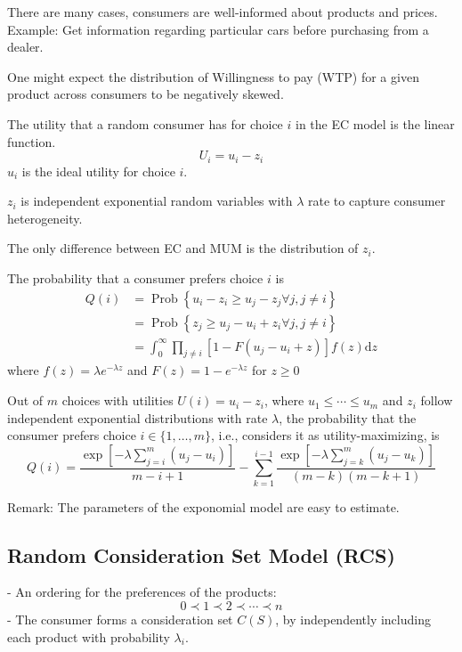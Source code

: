 \documentclass[11pt]{elegantbook}
\begin{document}
There are many cases, consumers are well-informed about products and prices.
Example: Get information regarding particular cars before purchasing from a dealer.

One might expect the distribution of Willingness to pay (WTP) for a given product across consumers to be negatively skewed.

The utility that a random consumer has for choice $i$ in the EC model is the linear function. $$U_i=u_i-z_i$$
$u_i$ is the ideal utility for choice $i$.

$z_i$ is independent exponential random variables with $\lambda$ rate to capture consumer heterogeneity.

The only difference between EC and MUM is the distribution of $z_i$.

The probability that a consumer prefers choice $i$ is
$$
\begin{aligned}
Q(i) &=\operatorname{Prob}\left\{u_{i}-z_{i} \geq u_{j}-z_{j} \forall j, j \neq i\right\} \\
&=\operatorname{Prob}\left\{z_{j} \geq u_{j}-u_{i}+z_{i} \forall j, j \neq i\right\} \\
&=\int_{0}^{\infty} \prod_{j \neq i}\left[1-F\left(u_{j}-u_{i}+z\right)\right] f(z) \mathrm{d} z
\end{aligned}
$$
where $f(z)=\lambda e^{-\lambda z}$ and $F(z)=1-e^{-\lambda z}$ for $z \geq 0$

\begin{theorem}
    Out of $m$ choices with utilities $U(i)=u_{i}-z_{i}$, where $u_{1} \leq \cdots \leq u_{m}$ and $z_{i}$ follow independent exponential distributions with rate $\lambda$, the probability that the consumer prefers choice $i \in\{1, \ldots, m\}$, i.e., considers it as utility-maximizing, is
    $$
    Q(i)=\frac{\exp \left[-\lambda \sum_{j=i}^{m}\left(u_{j}-u_{i}\right)\right]}{m-i+1}-\sum_{k=1}^{i-1} \frac{\exp \left[-\lambda \sum_{j=k}^{m}\left(u_{j}-u_{k}\right)\right]}{(m-k)(m-k+1)}
    $$
\end{theorem}
Remark: The parameters of the exponomial model are easy to estimate.

\subsection{Random Consideration Set Model (RCS)}
- An ordering for the preferences of the products:
$$
0 \prec 1 \prec 2 \prec \cdots \prec n
$$
- The consumer forms a consideration set $C(S)$, by independently including each product with probability $\lambda_{i}$.
\end{document}
